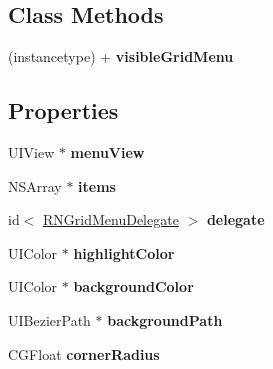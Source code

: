 \subsection*{Class Methods}
\begin{DoxyCompactItemize}
\item 
\hypertarget{interface_r_n_grid_menu_ae2af97b485c8131043ee34494cd257be}{}(instancetype) + {\bfseries visible\+Grid\+Menu}\label{interface_r_n_grid_menu_ae2af97b485c8131043ee34494cd257be}

\end{DoxyCompactItemize}
\subsection*{Properties}
\begin{DoxyCompactItemize}
\item 
\hypertarget{interface_r_n_grid_menu_ab884f1ed70118b9a02d1dbc78149753b}{}U\+I\+View $\ast$ {\bfseries menu\+View}\label{interface_r_n_grid_menu_ab884f1ed70118b9a02d1dbc78149753b}

\item 
\hypertarget{interface_r_n_grid_menu_adf89f860baaf51d1aae9612fa73a7182}{}N\+S\+Array $\ast$ {\bfseries items}\label{interface_r_n_grid_menu_adf89f860baaf51d1aae9612fa73a7182}

\item 
\hypertarget{interface_r_n_grid_menu_a38fd2493299357e58e8818cb510ff276}{}id$<$ \hyperlink{protocol_r_n_grid_menu_delegate-p}{R\+N\+Grid\+Menu\+Delegate} $>$ {\bfseries delegate}\label{interface_r_n_grid_menu_a38fd2493299357e58e8818cb510ff276}

\item 
\hypertarget{interface_r_n_grid_menu_a253c26fadad8689834487b0d785e360a}{}U\+I\+Color $\ast$ {\bfseries highlight\+Color}\label{interface_r_n_grid_menu_a253c26fadad8689834487b0d785e360a}

\item 
\hypertarget{interface_r_n_grid_menu_a2c4c4352b93207aa4617afb7c460a99e}{}U\+I\+Color $\ast$ {\bfseries background\+Color}\label{interface_r_n_grid_menu_a2c4c4352b93207aa4617afb7c460a99e}

\item 
\hypertarget{interface_r_n_grid_menu_ac21882771909217741e5e8a2c2e7bc91}{}U\+I\+Bezier\+Path $\ast$ {\bfseries background\+Path}\label{interface_r_n_grid_menu_ac21882771909217741e5e8a2c2e7bc91}

\item 
\hypertarget{interface_r_n_grid_menu_a96a537714479153997371b1616218ffa}{}C\+G\+Float {\bfseries corner\+Radius}\label{interface_r_n_grid_menu_a96a537714479153997371b1616218ffa}


\end{DoxyCompactItemize}
